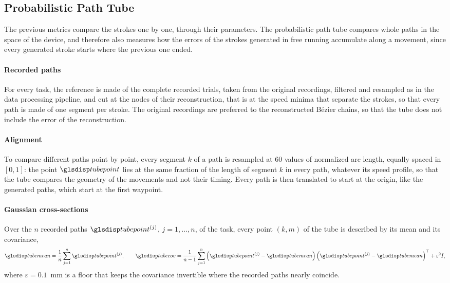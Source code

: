 \documentclass[12pt]{report}
\begin{document}
\subsection{Probabilistic Path Tube}
\label{sec:path_tube}
The previous metrics compare the strokes one by one, through their parameters. The probabilistic path tube compares whole paths in the space of the device, and therefore also measures how the errors of the strokes generated in free running accumulate along a movement, since every generated stroke starts where the previous one ended.

\paragraph{Recorded paths}
For every task, the reference is made of the complete recorded trials, taken from the original recordings, filtered and resampled as in the data processing pipeline, and cut at the nodes of their reconstruction, that is at the speed minima that separate the strokes, so that every path is made of one segment per stroke. The original recordings are preferred to the reconstructed Bézier chains, so that the tube does not include the error of the reconstruction.

\paragraph{Alignment}
To compare different paths point by point, every segment $k$ of a path is resampled at 60 values of normalized arc length, equally spaced in $[0,1]$: the point $\sym{tubepoint}_{k,m}$ lies at the same fraction of the length of segment $k$ in every path, whatever its speed profile, so that the tube compares the geometry of the movements and not their timing. Every path is then translated to start at the origin, like the generated paths, which start at the first waypoint.

\paragraph{Gaussian cross-sections}
Over the $n$ recorded paths $\sym{tubepoint}^{(j)}$, $j=1,\dots,n$, of the task, every point $(k,m)$ of the tube is described by its mean and its covariance,
\begin{equation}
    \sym{tubemean}_{k,m}=\frac1n\sum_{j=1}^{n}\sym{tubepoint}_{k,m}^{(j)},\qquad
    \sym{tubecov}_{k,m}=\frac1{n-1}\sum_{j=1}^{n}\left(\sym{tubepoint}_{k,m}^{(j)}-\sym{tubemean}_{k,m}\right)\left(\sym{tubepoint}_{k,m}^{(j)}-\sym{tubemean}_{k,m}\right)^{\top}+\varepsilon^2 I,
\end{equation}
where $\varepsilon=0.1$~mm is a floor that keeps the covariance invertible where the recorded paths nearly coincide.
\end{document}
